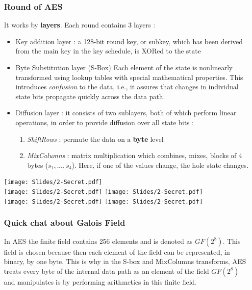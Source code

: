 \documentclass[../Cryptography.tex]{subfiles}
\begin{document}
\subsubsection{Round of AES}
It works by \textbf{layers}. Each round contains 3 layers :
\begin{itemize}
    \item Key addition layer : a 128-bit round key, or subkey, which has been derived from the main key in the key schedule, is XORed to the state
    \item Byte Substitution layer (S-Box) Each element of the state is nonlinearly transformed using lookup tables with special mathematical properties. This introduces \textit{confusion} to the data, i.e., it assures that changes in individual state bits propagate
    quickly across the data path.
    \item Diffusion layer : it consists of two sublayers,
both of which perform linear operations, in order to provide diffusion over all state bits :
    \begin{enumerate}
        \item \textit{ShiftRows} : permute the data on a \textbf{byte} level
        \item \textit{MixColumns} : matrix multiplication which combines, mixes, blocks of 4 bytes ($s_1, ..., s_4$). Here, if one of the values change, the hole state changes.
    \end{enumerate}
\end{itemize}

\begin{center}
    \texttt{[image: Slides/2-Secret.pdf]} \\
    \texttt{[image: Slides/2-Secret.pdf]}
    \texttt{[image: Slides/2-Secret.pdf]} \\
    \texttt{[image: Slides/2-Secret.pdf]}
    \texttt{[image: Slides/2-Secret.pdf]}
\end{center}
\subsubsection{Quick chat about Galois Field}
In AES the finite field contains 256 elements and is denoted as $GF(2^8)$. This field is chosen because then each element of the field can be represented, in binary, by one byte. This is why in the S-box and MixColumns transforms, AES treats every byte of the internal data path as an element of the field $GF(2^8)$ and manipulates is by performing arithmetics in this finite field.
\end{document}
